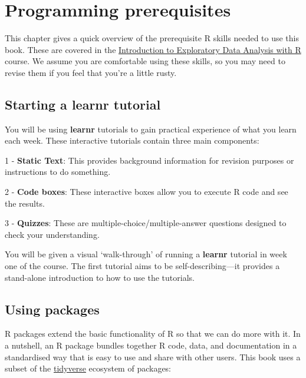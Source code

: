 \documentclass[
]{book}
\begin{document}
\hypertarget{programming-prerequisites-1}{%
\chapter*{Programming prerequisites}\label{programming-prerequisites-1}}

This chapter gives a quick overview of the prerequisite R skills needed to use this book. These are covered in the \href{https://dzchilds.github.io/eda-for-bio}{Introduction to Exploratory Data Analysis with R} course. We assume you are comfortable using these skills, so you may need to revise them if you feel that you're a little rusty.

\hypertarget{starting-a-learnr-tutorial}{%
\section{\texorpdfstring{Starting a \textbf{learnr} tutorial}{Starting a learnr tutorial}}\label{starting-a-learnr-tutorial}}

You will be using \textbf{learnr} tutorials to gain practical experience of what you learn each week. These interactive tutorials contain three main components:

1 - \textbf{Static Text}: This provides background information for revision purposes or instructions to do something.

2 - \textbf{Code boxes}: These interactive boxes allow you to execute R code and see the results.

3 - \textbf{Quizzes}: These are multiple-choice/multiple-answer questions designed to check your understanding.

You will be given a visual `walk-through' of running a \textbf{learnr} tutorial in week one of the course. The first tutorial aims to be self-describing---it provides a stand-alone introduction to how to use the tutorials.

\hypertarget{using-packages-1}{%
\section{Using packages}\label{using-packages-1}}

R packages extend the basic functionality of R so that we can do more with it. In a nutshell, an R package bundles together R code, data, and documentation in a standardised way that is easy to use and share with other users. This book uses a subset of the \href{https://www.tidyverse.org}{tidyverse} ecosystem of packages:
\end{document}
